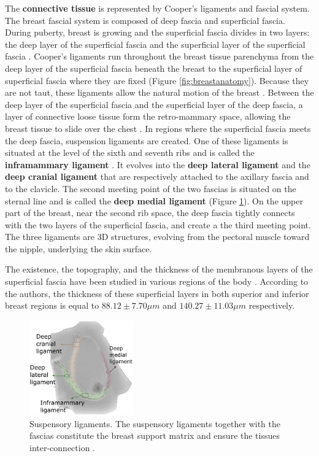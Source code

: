 The \textbf{connective tissue} is represented by Cooper's ligaments and fascial system. The breast fascial system is composed of deep fascia and superficial fascia. During puberty, breast is growing and the superficial fascia divides in two layers: the deep layer of the superficial fascia and the superficial layer of the superficial fascia \citep{kopans2007breast}.  Cooper's ligaments run throughout the breast tissue parenchyma from the deep layer of the superficial fascia beneath the breast to the superficial layer of superficial fascia where they are fixed (Figure \ref{fig:breastanatomy}). Because they are not taut, these ligaments allow the natural motion of the breast \citep{clemente2011anatomy}. Between the deep layer of the superficial fascia and the superficial layer of the deep fascia, a layer of connective loose tissue form the retro-mammary space, allowing the breast tissue to slide over the chest \citep{mugea2014aesthetic}. In regions where the superficial fascia meets the deep fascia, suspension ligaments are created. One of these ligaments is situated at the level of the sixth and seventh ribs and is called the \textbf{inframammary ligament} \citep{bayati_inframammary_1995}. It evolves into the \textbf{deep lateral ligament} and the \textbf{deep cranial ligament} that are respectively attached to the axillary fascia and to the clavicle. The second meeting point of the two fascias is situated on the sternal line and is called the \textbf{deep medial ligament} (Figure \ref{fig:suspensoryligaments}). On the upper part of the breast, near the second rib space, the deep fascia tightly connects with the two layers of the superficial fascia, and create a the third meeting point. The three ligaments are 3D structures, evolving from the pectoral muscle toward the nipple, underlying the skin surface.


The existence, the topography, and the thickness of the membranous layers of the superficial fascia have been studied in various regions of the body \citep{abu_membranous_2006}. According to the authors, the thickness of these superficial layers in both superior and inferior breast regions is equal to $88.12 \pm 7.70 \mu m$ and $140.27 \pm 11.03 \mu m$ respectively.

\begin{figure}[!h]
\centering
\centerline{\includegraphics[width=0.4\textwidth,keepaspectratio]{figures/breastLigaments.png} }
\caption{Suspensory ligaments. The suspensory ligaments together with the fascias constitute the breast support matrix and ensure the tissues inter-connection  \citep{mugea2014aesthetic}.}
\label{fig:suspensoryligaments}
\end{figure}


